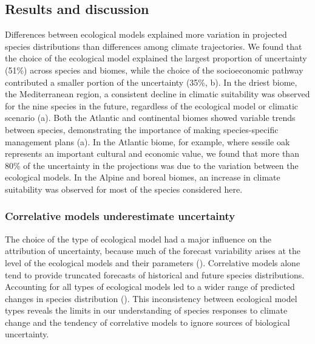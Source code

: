 \documentclass[11pt,letter]{article}
\begin{document}
\subsection*{Results and discussion}


Differences between ecological models explained more variation in projected species distributions than differences among climate trajectories. We found that the choice of the ecological model explained the largest proportion of uncertainty (51\%) across species and biomes, while the choice of the socioeconomic pathway contributed a smaller portion of the uncertainty (35\%, b). In the driest biome, the Mediterranean region, a consistent decline in climatic suitability was observed for the nine species in the future, regardless of the ecological model or climatic scenario (a). Both the Atlantic and continental biomes showed variable trends between species, demonstrating the importance of making species-specific management plans (a). In the Atlantic biome, for example, where sessile oak represents an important cultural and economic value, we found that more than 80\% of the uncertainty in the projections was due to the variation between the ecological models. In the Alpine and boreal biomes, an increase in climate suitability was observed for most of the species considered here. 


\subsubsection*{Correlative models underestimate uncertainty}

The choice of the type of ecological model had a major influence on the attribution of uncertainty, because much of the forecast variability arises at the level of the ecological models and their parameters (). Correlative models alone tend to provide truncated forecasts of historical and future species distributions. Accounting for all types of ecological models led to a wider range of predicted changes in species distribution (). This inconsistency between ecological model types reveals the limits in our understanding of species responses to climate change and the tendency of correlative models to ignore sources of biological uncertainty. 
\end{document}
